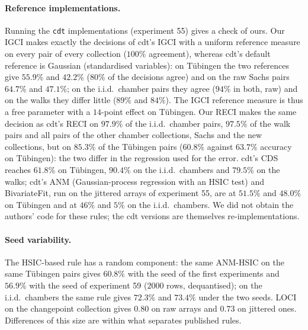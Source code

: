 \paragraph{Reference implementations.} Running the \texttt{cdt} implementations (experiment 55) gives a check of ours. Our IGCI makes exactly the decisions of cdt's IGCI with a uniform reference measure on every pair of every collection ($100\%$ agreement), whereas cdt's default reference is Gaussian (standardised variables): on T\"ubingen the two references give $55.9\%$ and $42.2\%$ ($80\%$ of the decisions agree) and on the raw Sachs pairs $64.7\%$ and $47.1\%$; on the i.i.d.\ chamber pairs they agree ($94\%$ in both, raw) and on the walks they differ little ($89\%$ and $84\%$). The IGCI reference measure is thus a free parameter with a $14$-point effect on T\"ubingen. Our RECI makes the same decision as cdt's RECI on $97.9\%$ of the i.i.d.\ chamber pairs, $97.5\%$ of the walk pairs and all pairs of the other chamber collections, Sachs and the new collections, but on $85.3\%$ of the T\"ubingen pairs ($60.8\%$ against $63.7\%$ accuracy on T\"ubingen): the two differ in the regression used for the error. cdt's CDS reaches $61.8\%$ on T\"ubingen, $90.4\%$ on the i.i.d.\ chambers and $79.5\%$ on the walks; cdt's ANM (Gaussian-process regression with an HSIC test) and BivariateFit, run on the jittered arrays of experiment 55, are at $51.5\%$ and $48.0\%$ on T\"ubingen and at $46\%$ and $5\%$ on the i.i.d.\ chambers. We did not obtain the authors' code for these rules; the cdt versions are themselves re-implementations.

\paragraph{Seed variability.} The HSIC-based rule has a random component: the same ANM-HSIC on the same T\"ubingen pairs gives $60.8\%$ with the seed of the first experiments and $56.9\%$ with the seed of experiment 59 ($2000$ rows, dequantised); on the i.i.d.\ chambers the same rule gives $72.3\%$ and $73.4\%$ under the two seeds. LOCI on the changepoint collection gives $0.80$ on raw arrays and $0.73$ on jittered ones. Differences of this size are within what separates published rules.
